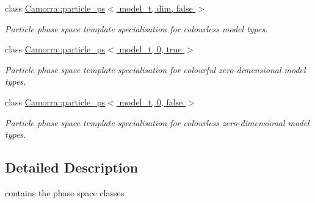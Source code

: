 \begin{DoxyCompactItemize}
class \hyperlink{a00372}{Camorra::particle\_\-ps$<$ model\_\-t, dim, false $>$}
\begin{DoxyCompactList}\small\item\em Particle phase space template specialisation for colourless model types. \end{DoxyCompactList}\item 
class \hyperlink{a00371}{Camorra::particle\_\-ps$<$ model\_\-t, 0, true $>$}
\begin{DoxyCompactList}\small\item\em Particle phase space template specialisation for colourful zero-\/dimensional model types. \end{DoxyCompactList}\item 
class \hyperlink{a00370}{Camorra::particle\_\-ps$<$ model\_\-t, 0, false $>$}
\begin{DoxyCompactList}\small\item\em Particle phase space template specialisation for colourless zero-\/dimensional model types. \end{DoxyCompactList}\end{DoxyCompactItemize}


\subsection{Detailed Description}
contains the phase space classes 